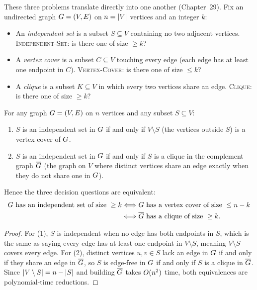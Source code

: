 These three problems translate directly into one another (Chapter~29). Fix an undirected graph $G=(V,E)$ on $n=\lvert V\rvert$ vertices and an integer $k$:

\begin{itemize}
  \item An \emph{independent set} is a subset $S\subseteq V$ containing no two adjacent vertices.
        \textsc{Independent-Set}: is there one of size $\ge k$?
  \item A \emph{vertex cover} is a subset $C\subseteq V$ touching every edge (each
        edge has at least one endpoint in $C$). \textsc{Vertex-Cover}: is there
        one of size $\le k$?
  \item A \emph{clique} is a subset $K\subseteq V$ in which every two vertices share an edge.
        \textsc{Clique}: is there one of size $\ge k$?
\end{itemize}

\begin{lemma}
\label{ch37:lem-triangle}
For any graph $G=(V,E)$ on $n$ vertices and any subset $S\subseteq V$:
\begin{enumerate}
  \item $S$ is an independent set in $G$ if and only if $V\setminus S$ (the vertices outside $S$) is a vertex cover of
        $G$.
  \item $S$ is an independent set in $G$ if and only if $S$ is a clique in the complement graph
        $\overline{G}$ (the graph on $V$ where distinct vertices share an edge exactly when they do not share one in $G$).
\end{enumerate}
Hence the three decision questions are equivalent:
\begin{align*}
  G \text{ has an independent set of size } \ge k
  &\Longleftrightarrow G \text{ has a vertex cover of size } \le n-k \\
  &\Longleftrightarrow \overline{G} \text{ has a clique of size } \ge k.
\end{align*}
\end{lemma}

\begin{proof}
For (1), $S$ is independent when no edge has both endpoints in $S$, which is the same as saying every edge has at least one endpoint in $V\setminus S$, meaning $V\setminus S$ covers every edge. For (2), distinct vertices $u,v\in S$ lack an edge in $G$ if and only if they share an edge in $\overline{G}$, so $S$ is edge-free in $G$ if and only if $S$ is a clique in $\overline{G}$.
Since $\lvert V\setminus S\rvert=n-\lvert S\rvert$ and building $\overline{G}$ takes $O(n^2)$ time, both equivalences are polynomial-time reductions.
\end{proof}

